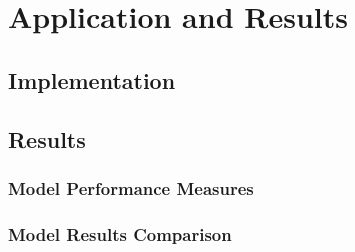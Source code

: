 
\chapter{Application and Results} %

\label{Chapter5} %



\section{Implementation}
\label{chp5-sec1}


\section{Results}
\label{chp5-sec2}

\subsection{Model Performance Measures}
\label{chp5-sec2.1}

\subsection{Model Results Comparison}
\label{chp5-sec2.2}

